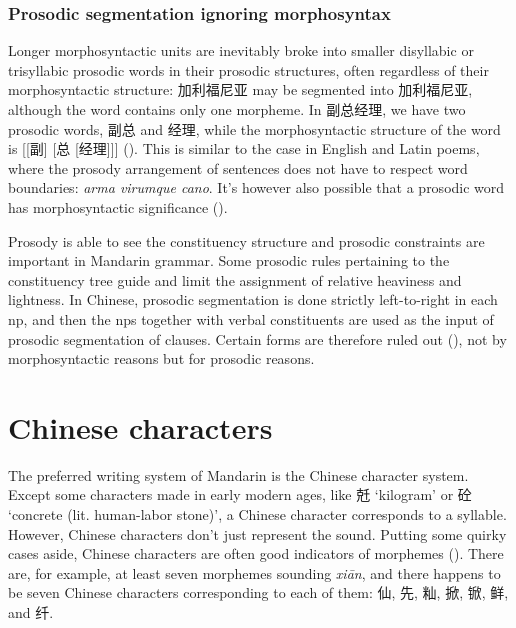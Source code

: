 \documentclass[UTF8, a4paper, oneside, scheme=plain, 12pt]{ctexrep}
\newcommand{\form}[1]{\emph{#1}}
\newcommand{\translate}[1]{`#1'}
\begin{document}
\subsubsection{Prosodic segmentation ignoring morphosyntax}\label{sec:prosody.word.ignorance}

Longer morphosyntactic units are 
inevitably broke into smaller disyllabic or trisyllabic prosodic words
in their prosodic structures,
often regardless of their morphosyntactic structure:
加利福尼亚 may be segmented into 加利\textbar 福尼亚, 
although the word contains only one morpheme.
In 副总经理,
we have two prosodic words,
副总 and 经理,
while the morphosyntactic structure of the word is [[副] [总 [经理]]]
().
This is similar to the case in English and Latin poems,
where the prosody arrangement of sentences does not have to respect word boundaries:
\form{arma vi\textbar rumque ca\textbar no}.
It's however also possible that 
a prosodic word has morphosyntactic significance
().

Prosody is able to see the constituency structure
and prosodic constraints are important in Mandarin grammar.
Some prosodic rules pertaining to the constituency tree 
guide and limit the assignment of relative heaviness and lightness.
In Chinese, prosodic segmentation is done strictly left-to-right 
in each \ac{np},
and then the \ac{np}s together with verbal constituents 
are used as the input of prosodic segmentation of clauses.
Certain forms are therefore ruled out
(), 
not by morphosyntactic reasons but for prosodic reasons.

\section{Chinese characters}\label{sec:chinese-character}

The preferred writing system of Mandarin is the Chinese character system.
Except some characters made in early modern ages,
like 兛 \translate{kilogram} or 砼 \translate{concrete (lit. human-labor stone)},
a Chinese character corresponds to a syllable.
However, Chinese characters don't just represent the sound.
Putting some quirky cases aside,
Chinese characters are often good indicators of morphemes
().
There are, for example, at least seven morphemes sounding \form{xi\={a}n},
and there happens to be seven Chinese characters corresponding to each of them:
仙, 先, 籼, 掀, 锨, 鲜, and 纤.
\end{document}
